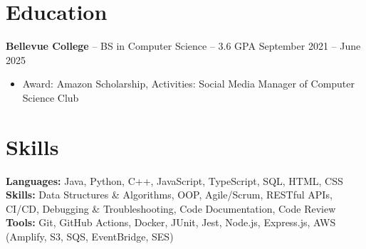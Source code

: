 \documentclass[11pt]{article}
\begin{document}

\vspace{-18.5pt}

\section*{Education}
\textbf{Bellevue College} -- BS in Computer Science -- 3.6 GPA \hfill September 2021 -- June 2025\\
\vspace{-9pt}
\begin{itemize}
  \item Award: Amazon Scholarship, Activities: Social Media Manager of Computer Science Club
\end{itemize}

\vspace{-18.5pt}

\section*{Skills}
\textbf{Languages:} Java, Python, C++, JavaScript, TypeScript, SQL, HTML, CSS\\
\textbf{Skills:} Data Structures \& Algorithms, OOP, Agile/Scrum, RESTful APIs, CI/CD, Debugging \& Troubleshooting, Code Documentation, Code Review\\
\textbf{Tools:} Git, GitHub Actions, Docker, JUnit, Jest, Node.js, Express.js, AWS (Amplify, S3, SQS, EventBridge, SES)

\vspace{-6.5pt}
\end{document}
